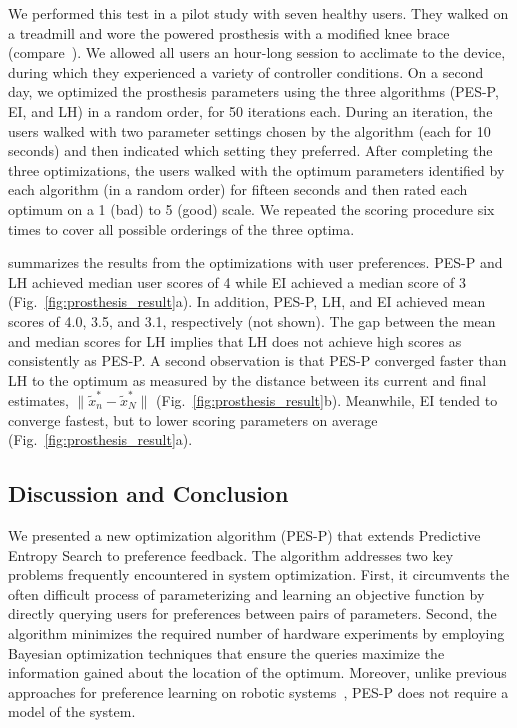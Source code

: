 We performed this test in a pilot study with seven healthy users. They walked
on a treadmill and wore the powered prosthesis with a modified knee brace
(compare~\citep{thatte2016toward}). We allowed all users an hour-long session to
acclimate to the device, during which they experienced a variety of controller
conditions. On a second day, we optimized the prosthesis parameters using the
three algorithms (PES-P, EI, and LH) in a random order, for 50 iterations each.
During an iteration, the users walked with two parameter settings chosen by the
algorithm (each for 10 seconds) and then indicated which setting they
preferred. After completing the three optimizations, the users walked with the
optimum parameters identified by each algorithm (in a random order) for fifteen
seconds and then rated each optimum on a 1 (bad) to 5 (good) scale. We repeated
the scoring procedure six times to cover all possible orderings of the three
optima.

 summarizes the results from the optimizations with
user preferences. PES-P and LH achieved median user scores of 4 while EI
achieved a median score of 3 (Fig.~\ref{fig:prosthesis_result}a). In addition,
PES-P, LH, and EI achieved mean scores of 4.0, 3.5, and 3.1, respectively (not
shown). The gap between the mean and median scores for LH implies that LH does
not achieve high scores as consistently as PES-P. A second observation is that
PES-P converged faster than LH to the optimum as measured by the distance
between its current and final estimates, $\lVert \tilde{x}_n^* - \tilde{x}_N^*
\rVert$ (Fig.~\ref{fig:prosthesis_result}b).  Meanwhile, EI tended to converge
fastest, but to lower scoring parameters on average
(Fig.~\ref{fig:prosthesis_result}a).

\subsection{Discussion and Conclusion}\label{sec:tuning_discussion}
We presented a new optimization algorithm (PES-P) that extends Predictive
Entropy Search to preference feedback. The algorithm addresses two key problems
frequently encountered in system optimization. First, it circumvents the often
difficult process of parameterizing and learning an objective function by
directly querying users for preferences between pairs of parameters. Second, the
algorithm minimizes the required number of hardware experiments by employing
Bayesian optimization techniques that ensure the queries maximize the
information gained about the location of the optimum. Moreover, unlike previous
approaches for preference learning on robotic systems~\citep{wilson2012bayesian,
jain2013learning}, PES-P does not require a model of the system.

